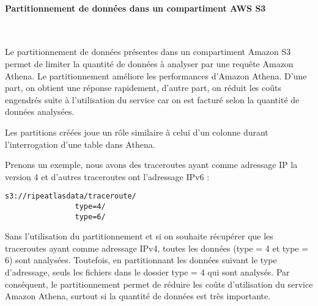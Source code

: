 \paragraph{Partitionnement de données dans un compartiment AWS S3} \label{subsubsection:partitionnement}~

Le partitionnement  de données présentes dans un compartiment Amazon S3 permet de limiter la quantité de données à analyser par une requête Amazon Athena. Le partitionnement améliore  les performances d'Amazon Athena. D'une part, on obtient une réponse rapidement, d'autre part, on réduit les coûts engendrés  suite à l'utilisation du service car on est facturé selon la quantité de données analysées.  

Les partitions créées joue un rôle similaire à celui d'un colonne durant l'interrogation d'une table dans Athena. 

Prenons un exemple, nous avons des traceroutes ayant comme adressage IP la version  4 et d'autres traceroutes ont l'adressage IPv6 :

\begin{lstlisting}
s3://ripeatlasdata/traceroute/
				type=4/
				type=6/
\end{lstlisting}

Sans l'utilisation du partitionnement et si on souhaite récupérer que les traceroutes ayant comme adressage IPv4, toutes les données (type = 4 et type = 6) sont analysées. Toutefois, en partitionnant les données suivant le type d'adressage, seuls les fichiers dans le dossier type = 4 qui sont analysés. Par conséquent, le partitionnement permet de réduire les coûts d'utilisation du service Amazon Athena, surtout si la quantité de données est très importante. 


